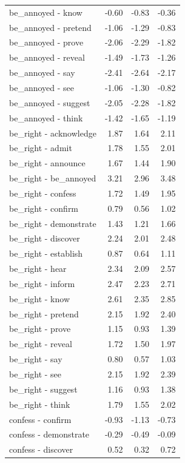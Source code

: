 \begin{longtable}{lrrr}
  be_annoyed - know & -0.60 & -0.83 & -0.36 \\ 
  be_annoyed - pretend & -1.06 & -1.29 & -0.83 \\ 
  be_annoyed - prove & -2.06 & -2.29 & -1.82 \\ 
  be_annoyed - reveal & -1.49 & -1.73 & -1.26 \\ 
  be_annoyed - say & -2.41 & -2.64 & -2.17 \\ 
  be_annoyed - see & -1.06 & -1.30 & -0.82 \\ 
  be_annoyed - suggest & -2.05 & -2.28 & -1.82 \\ 
  be_annoyed - think & -1.42 & -1.65 & -1.19 \\ 
  be_right - acknowledge & 1.87 & 1.64 & 2.11 \\ 
  be_right - admit & 1.78 & 1.55 & 2.01 \\ 
  be_right - announce & 1.67 & 1.44 & 1.90 \\ 
  be_right - be_annoyed & 3.21 & 2.96 & 3.48 \\ 
  be_right - confess & 1.72 & 1.49 & 1.95 \\ 
  be_right - confirm & 0.79 & 0.56 & 1.02 \\ 
  be_right - demonstrate & 1.43 & 1.21 & 1.66 \\ 
  be_right - discover & 2.24 & 2.01 & 2.48 \\ 
  be_right - establish & 0.87 & 0.64 & 1.11 \\ 
  be_right - hear & 2.34 & 2.09 & 2.57 \\ 
  be_right - inform & 2.47 & 2.23 & 2.71 \\ 
  be_right - know & 2.61 & 2.35 & 2.85 \\ 
  be_right - pretend & 2.15 & 1.92 & 2.40 \\ 
  be_right - prove & 1.15 & 0.93 & 1.39 \\ 
  be_right - reveal & 1.72 & 1.50 & 1.97 \\ 
  be_right - say & 0.80 & 0.57 & 1.03 \\ 
  be_right - see & 2.15 & 1.92 & 2.39 \\ 
  be_right - suggest & 1.16 & 0.93 & 1.38 \\ 
  be_right - think & 1.79 & 1.55 & 2.02 \\ 
  confess - confirm & -0.93 & -1.13 & -0.73 \\ 
  confess - demonstrate & -0.29 & -0.49 & -0.09 \\ 
  confess - discover & 0.52 & 0.32 & 0.72 \\ 

\end{longtable}
